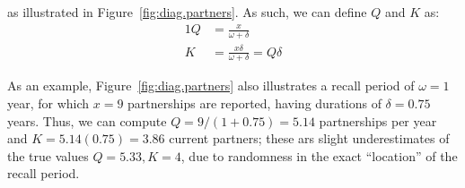 as illustrated in Figure~\ref{fig:diag.partners}.
As such, we can define $Q$ and $K$ as:
\begin{alignat}{1}
  Q &= \frac{x}{\omega + \delta}\\
  K &= \frac{x \delta}{\omega + \delta} = Q \delta
\end{alignat}
\par
As an example, Figure~\ref{fig:diag.partners} also illustrates
a recall period of $\omega = 1$ year,
for which $x = 9$ partnerships are reported,
having durations of $\delta = 0.75$ years.
Thus, we can compute
$Q = 9/(1+0.75) = 5.14$ partnerships per year and
$K = 5.14(0.75) = 3.86$ current partners;
these ars slight underestimates of the true values $Q = 5.33, K = 4$,
due to randomness in the exact ``location'' of the recall period.
